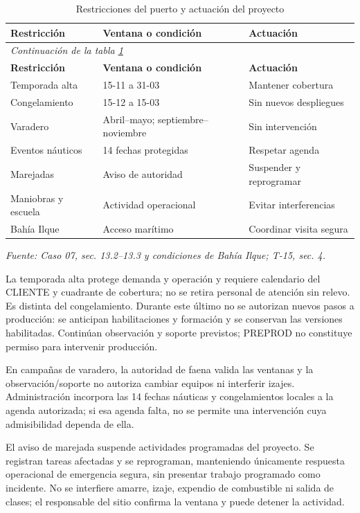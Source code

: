 \begingroup\small\setlength{\tabcolsep}{3pt}
\begin{longtable}{p{}p{}p{}}
\caption{Restricciones del puerto y actuación del proyecto}\label{tab:t18-restricciones}\\\hline
\textbf{Restricción} & \textbf{Ventana o condición} & \textbf{Actuación}\\\hline\endfirsthead
\multicolumn{3}{l}{\textit{Continuación de la tabla \ref{tab:t18-restricciones}}}\\\hline
\textbf{Restricción} & \textbf{Ventana o condición} & \textbf{Actuación}\\\hline\endhead
\hline\endfoot\hline\endlastfoot
Temporada alta & 15-11 a 31-03 & Mantener cobertura\\\hline
Congelamiento & 15-12 a 15-03 & Sin nuevos despliegues\\\hline
Varadero & Abril--mayo; septiembre--noviembre & Sin intervención\\\hline
Eventos náuticos & 14 fechas protegidas & Respetar agenda\\\hline
Marejadas & Aviso de autoridad & Suspender y reprogramar\\\hline
Maniobras y escuela & Actividad operacional & Evitar interferencias\\\hline
Bahía Ilque & Acceso marítimo & Coordinar visita segura\\\hline
\end{longtable}\endgroup
\noindent\textit{Fuente: Caso 07, sec. 13.2--13.3 y condiciones de Bahía Ilque; T-15, sec. 4.}

La temporada alta protege demanda y operación y requiere calendario del CLIENTE y cuadrante de cobertura; no se retira personal de atención sin relevo. Es distinta del congelamiento. Durante este último no se autorizan nuevos pasos a producción: se anticipan habilitaciones y formación y se conservan las versiones habilitadas. Continúan observación y soporte previstos; PREPROD no constituye permiso para intervenir producción.

En campañas de varadero, la autoridad de faena valida las ventanas y la observación/soporte no autoriza cambiar equipos ni interferir izajes. Administración incorpora las 14 fechas náuticas y congelamientos locales a la agenda autorizada; si esa agenda falta, no se permite una intervención cuya admisibilidad dependa de ella.

El aviso de marejada suspende actividades programadas del proyecto. Se registran tareas afectadas y se reprograman, manteniendo únicamente respuesta operacional de emergencia segura, sin presentar trabajo programado como incidente. No se interfiere amarre, izaje, expendio de combustible ni salida de clases; el responsable del sitio confirma la ventana y puede detener la actividad.


